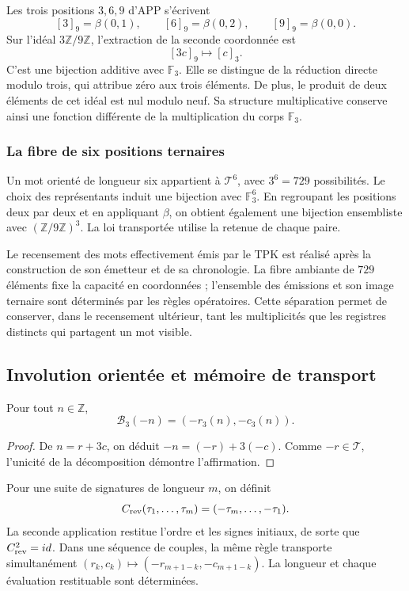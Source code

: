 Les trois positions \(3,6,9\) d'APP s'écrivent
\[
 [3]_9=\beta(0,1),\qquad
 [6]_9=\beta(0,2),\qquad
 [9]_9=\beta(0,0).
\]
Sur l'idéal \(3\mathbb Z/9\mathbb Z\), l'extraction de la seconde
coordonnée est
\[
 [3c]_9\longmapsto[c]_3.
\]
C'est une bijection additive avec \(\mathbb F_3\). Elle se distingue de la
réduction directe modulo trois, qui attribue zéro aux trois éléments.
De plus, le produit de deux éléments de cet idéal est nul modulo neuf.
Sa structure multiplicative conserve ainsi une fonction différente de la
multiplication du corps \(\mathbb F_3\).

\subsubsection{La fibre de six positions ternaires}

Un mot orienté de longueur six appartient à \(\mathcal T^6\),
avec \(3^6=729\) possibilités. Le choix des représentants induit une
bijection avec \(\mathbb F_3^6\). En regroupant les positions deux par deux et en
appliquant \(\beta\), on obtient également une bijection ensembliste avec
\((\mathbb Z/9\mathbb Z)^3\). La loi transportée utilise la retenue
de chaque paire.

Le recensement des mots effectivement émis par le TPK est réalisé après
la construction de son émetteur et de sa chronologie. La fibre ambiante de \(729\)
éléments fixe la capacité en coordonnées ; l'ensemble des émissions et son image
ternaire sont déterminés par les règles opératoires. Cette séparation permet de
conserver, dans le recensement ultérieur, tant les multiplicités que les
registres distincts qui partagent un mot visible.

\subsection{Involution orientée et mémoire de transport}
\label{trit:involucion}

\begin{proposicion}
Pour tout \(n\in\mathbb Z\),
\[
 \mathcal B_3(-n)=(-r_3(n),-c_3(n)).
\]
\end{proposicion}
\begin{proof}
De \(n=r+3c\), on déduit \(-n=(-r)+3(-c)\). Comme \(-r\in\mathcal T\),
l'unicité de la décomposition démontre l'affirmation.
\end{proof}

Pour une suite de signatures de longueur \(m\), on définit
\[
 \mathcal C_{\rm rev}(\tau_1,\ldots,\tau_m)
 =(-\tau_m,\ldots,-\tau_1).
\]
La seconde application restitue l'ordre et les signes initiaux, de sorte
que \(\mathcal C_{\rm rev}^{2}=\operatorname{id}\). Dans une séquence
de couples, la même règle transporte simultanément
\((r_k,c_k)\mapsto(-r_{m+1-k},-c_{m+1-k})\). La longueur et chaque
évaluation restituable sont déterminées.


